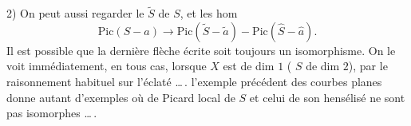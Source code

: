 2) On peut aussi regarder le 
$\widetilde S$ de $S$, et les hom
\[
\mathrm{Pic}(S-a)\longrightarrow\mathrm{Pic}(\widetilde S-\widetilde a)-\mathrm{Pic}(\widehat S-\widehat a).
\]
Il est possible que la dernière flèche
écrite soit toujours un isomorphisme.
On le voit immédiatement, en tous cas,
lorsque $X$ est de dim $1$ ( $S$ de
dim $2$), par le raisonnement habituel
sur l'éclaté \ldots\,.  l'exemple précédent
des courbes planes donne autant
d'exemples où   de Picard local de
$S$ et celui de son hensélisé ne sont
pas isomorphes \ldots\,.
